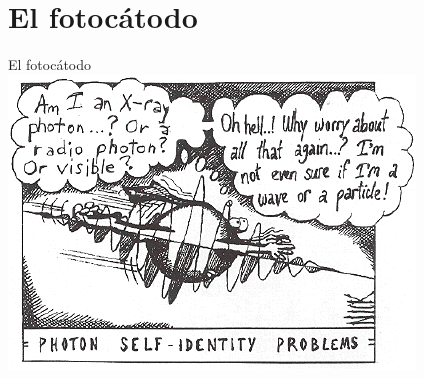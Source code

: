 \documentclass[a4paper,10pt]{beamer}
\begin{document}
\section{El fotocátodo}

\begin{frame}
\begin{center}
 \Huge{\color{blue}El fotocátodo} \\
 \vspace{1cm}
 \includegraphics[scale=0.7]{fig4}
\end{center}
\end{frame}
\end{document}
